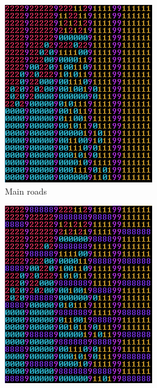 		\begin{figure}[h]
			\begin{subfigure}{0.5\textwidth}
				\centering
				\includegraphics[width=0.9\linewidth]{"Images/map main roads colored"}
				\caption{Main roads}
				\label{fig:map-main-roads}
			\end{subfigure}
			\begin{subfigure}{0.5\textwidth}
				\centering
				\includegraphics[width=0.9\linewidth]{"Images/map small roads colored"}

\end{subfigure}
\end{figure}
